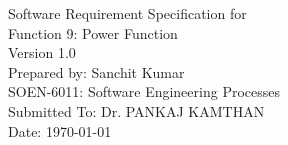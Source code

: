 \documentclass[a4paper,12pt]{scrreprt}
\newcommand{\Author}{Sanchit Kumar}
\newcommand{\ProjectName}{Function 9: Power Function}
\newcommand{\Title}{Software Requirement Specification}
\newcommand{\Course}{SOEN-6011: Software Engineering Processes}
\newcommand{\ProfessorName}{Dr. PANKAJ KAMTHAN}
\begin{document}
\begin{flushright} %
	
	\begin{bfseries}
		\Huge \Title \vspace{15mm}
		for \\ \vspace{15mm}
		\ProjectName \vspace{15mm}
		\Large \\ Version 1.0 \vspace{15mm} \\
		\vspace{10cm}
		Prepared by: \Author \\ 
		\Course \\ Submitted To: \ProfessorName  \\ Date: \today 

		
	\end{bfseries}	
\end{flushright}
	
\tableofcontents



	
\end{document}
